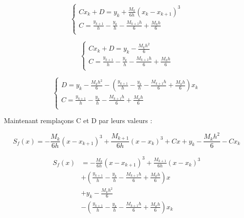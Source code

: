 \documentclass[12pt, letterpaper]{article}
\begin{document}
\begin{enumerate}
\begin{enumerate}
    \begin{equation*}
      \left\{
      \begin{array}{l}
        C x_k + D = y_k + \frac{M_k}{6h} (x_k - x_{k + 1})^3\\
        C = \frac{y_{k + 1}}{h} - \frac{y_k}{h} - \frac{M_{k
          + 1} h}{6} + \frac{M_k h}{6}\\
      \end{array}
      \right.
    \end{equation*}

    \begin{equation*}
      \left\{
      \begin{array}{l}
        C x_k + D = y_k - \frac{M_k h^2}{6}\\
        C = \frac{y_{k + 1}}{h} - \frac{y_k}{h} - \frac{M_{k
          + 1} h}{6} + \frac{M_k h}{6}\\
      \end{array}
      \right.
    \end{equation*}

    \begin{equation*}
      \left\{
      \begin{array}{l}
        D = y_k - \frac{M_k h^2}{6} - (\frac{y_{k + 1}}{h} - \frac{y_k}{h} - \frac{M_{k
          + 1} h}{6} + \frac{M_k h}{6}) x_k\\
        C = \frac{y_{k + 1}}{h} - \frac{y_k}{h} - \frac{M_{k
          + 1} h}{6} + \frac{M_k h}{6}\\
      \end{array}
      \right.
    \end{equation*}

    Maintenant remplaçons C et D par leurs valeurs :

    \begin{equation*}
      S_f(x) = - \frac{M_k}{6h} (x - x_{k + 1})^3 + 
      \frac{M_{k + 1}}{6h} (x - x_k)^3 + C x + y_k - \frac{M_k h^2}{6} - C x_k
    \end{equation*}

    \begin{equation*}
      \begin{split}
        S_f(x) & = - \frac{M_k}{6h} (x - x_{k + 1})^3 + 
        \frac{M_{k + 1}}{6h} (x - x_k)^3 \\
        & + \left( \frac{y_{k + 1}}{h} - \frac{y_k}{h} - \frac{M_{k
            + 1} h}{6} + \frac{M_k h}{6} \right) x \\
        & + y_k - \frac{M_k h^2}{6} \\
        & - \left( \frac{y_{k + 1}}{h} - \frac{y_k}{h} - \frac{M_{k
            + 1} h}{6} + \frac{M_k h}{6} \right) x_k\\
      \end{split}
    \end{equation*}


\end{enumerate}
\end{enumerate}
\end{document}
